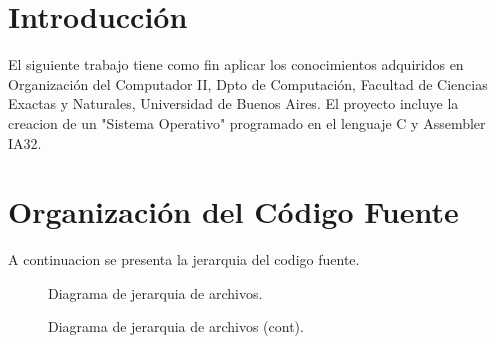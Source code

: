 \documentclass[a4paper,10pt]{article}
\begin{document}
\newpage
\tableofcontents
\newpage



\section*{Introducci\'on}
El siguiente trabajo tiene como fin aplicar los conocimientos adquiridos en Organización del Computador II, Dpto de Computación, Facultad de Ciencias Exactas y Naturales, Universidad de Buenos Aires.	El proyecto incluye la creacion de un "Sistema Operativo" programado en el lenguaje C y Assembler IA32.


\newpage
\section{Organizaci\'on del C\'odigo Fuente}
A continuacion se presenta la jerarquia del codigo fuente.

\begin{figure}[H]
\centering
{}
\caption{Diagrama de jerarquia de archivos.}
\end{figure}

\begin{figure}[H]
\centering
{}
\caption{Diagrama de jerarquia de archivos (cont).}
\end{figure}
\end{document}
